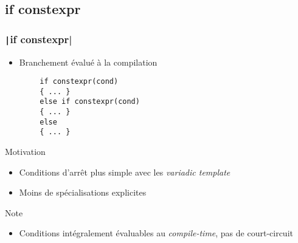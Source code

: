 \documentclass[C++.tex]{subfiles}
\begin{document}
\subsection*{if constexpr}
\begin{frame}[fragile]
	\frametitle{\texttt|if constexpr|}
	\begin{itemize}
		\item Branchement évalué à la compilation
	\end{itemize}

	\begin{verbatim}
		if constexpr(cond)
		{ ... }
		else if constexpr(cond)
		{ ... }
		else
		{ ... }
	\end{verbatim}

	\begin{block}{Motivation}
		\begin{itemize}
			\item Conditions d'arrêt plus simple avec les \textit{variadic template}
			\item Moins de spécialisations explicites
		\end{itemize}
	\end{block}

	\begin{block}{Note}
		\begin{itemize}
			\item Conditions intégralement évaluables au \textit{compile-time}, pas de court-circuit
		\end{itemize}

	\end{block}

\end{frame}
\end{document}
